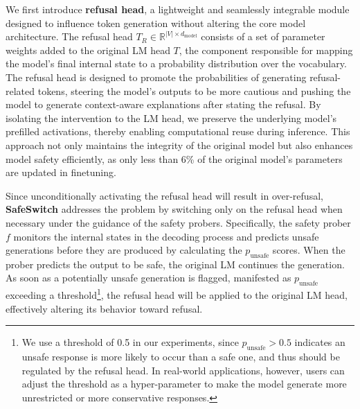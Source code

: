 
We first introduce \textbf{refusal head}, a lightweight and seamlessly integrable module designed to influence token generation without altering the core model architecture. The refusal head $T_R\in \mathbb{R}^{|V|\times d_{\text{model}}}$ consists of a set of parameter weights added to the original LM head $T$, the component responsible for mapping the model's final internal state to a probability distribution over the vocabulary. The refusal head is designed to promote the probabilities of generating refusal-related tokens, steering the model's outputs to be more cautious and pushing the model to generate context-aware explanations after stating the refusal. By isolating the intervention to the LM head, we preserve the underlying model’s prefilled activations, thereby enabling computational reuse during inference. This approach not only maintains the integrity of the original model but also enhances model safety efficiently, as only less than 6\% of the original model's parameters are updated in finetuning.

Since unconditionally activating the refusal head will result in over-refusal, \textbf{SafeSwitch} addresses the problem by switching only on the refusal head when necessary under the guidance of the safety probers. Specifically, the safety prober $f$ monitors the internal states in the decoding process and predicts unsafe generations before they are produced by calculating the $p_{\text{unsafe}}$ scores. When the prober predicts the output to be safe, the original LM continues the generation. As soon as a potentially unsafe generation is flagged, manifested as $p_{\text{unsafe}}$ exceeding a threshold\footnote{We use a threshold of 0.5 in our experiments, since $p_{\text{unsafe}}>0.5$ indicates an unsafe response is more likely to occur than a safe one, and thus should be regulated by the refusal head. In real-world applications, however, users can adjust the threshold as a hyper-parameter to make the model generate more unrestricted or more conservative responses.}, the refusal head will be applied to the original LM head, effectively altering its behavior toward refusal. 

